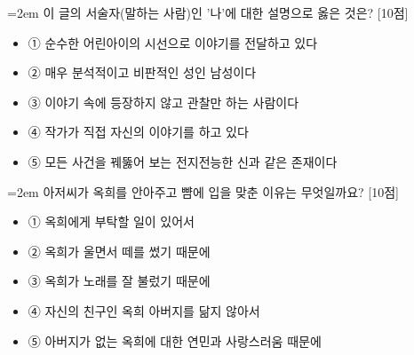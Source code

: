 \documentclass[12pt,a4paper]{article}
\newcommand{\qnum}[1]{%
  \tikz[baseline=(num.base)]{%
    \node[circle, fill=numCircle, text=white, inner sep=0pt,
          minimum size=18pt, font=\small\bfseries] (num) {#1};%
  }%
}
\newcommand{\pts}[1]{%
  \hfill\textcolor{ptsBadge}{[#1점]}%
}
\begin{document}
\vspace{4mm}
\begin{minipage}{\columnwidth}
{\hangindent=2em
\qnum{36}\enspace 이 글의 서술자(말하는 사람)인 '나'에 대한 설명으로 옳은 것은? \pts{10}
\par}

\vspace{3mm}
\begin{itemize}[leftmargin=2.5em, labelsep=0.3em, label={}, itemsep=4pt, parsep=1pt, topsep=0pt]
  \item ① 순수한 어린아이의 시선으로 이야기를 전달하고 있다
  \item ② 매우 분석적이고 비판적인 성인 남성이다
  \item ③ 이야기 속에 등장하지 않고 관찰만 하는 사람이다
  \item ④ 작가가 직접 자신의 이야기를 하고 있다
  \item ⑤ 모든 사건을 꿰뚫어 보는 전지전능한 신과 같은 존재이다
\end{itemize}
\end{minipage}
\vspace{4mm}

\vspace{4mm}
\begin{minipage}{\columnwidth}
{\hangindent=2em
\qnum{37}\enspace 아저씨가 옥희를 안아주고 뺨에 입을 맞춘 이유는 무엇일까요? \pts{10}
\par}

\vspace{3mm}
\begin{itemize}[leftmargin=2.5em, labelsep=0.3em, label={}, itemsep=4pt, parsep=1pt, topsep=0pt]
  \item ① 옥희에게 부탁할 일이 있어서
  \item ② 옥희가 울면서 떼를 썼기 때문에
  \item ③ 옥희가 노래를 잘 불렀기 때문에
  \item ④ 자신의 친구인 옥희 아버지를 닮지 않아서
  \item ⑤ 아버지가 없는 옥희에 대한 연민과 사랑스러움 때문에
\end{itemize}
\end{minipage}
\vspace{4mm}
\end{document}
